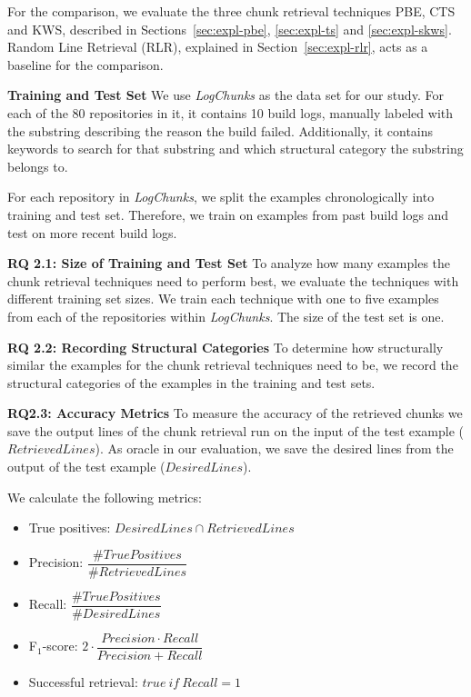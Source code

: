 For the comparison, we evaluate the three chunk retrieval techniques PBE, CTS and KWS, described in Sections~\ref{sec:expl-pbe}, \ref{sec:expl-ts} and \ref{sec:expl-skws}.
Random Line Retrieval (RLR), explained in Section~\ref{sec:expl-rlr}, acts as a baseline for the comparison.

\noindent
\textbf{Training and Test Set}
We use \emph{LogChunks} as the data set for our study.
For each of the 80 repositories in it, it contains 10 build logs, manually labeled with the substring describing the reason the build failed.
Additionally, it contains keywords to search for that substring and which structural category the substring belongs to.

For each repository in \emph{LogChunks}, we split the examples chronologically into training and test set.
Therefore, we train on examples from past build logs and test on more recent build logs.

\noindent
\textbf{RQ 2.1: Size of Training and Test Set}
To analyze how many examples the chunk retrieval techniques need to perform best, we evaluate the techniques with different training set sizes.
We train each technique with one to five examples from each of the repositories within \emph{LogChunks}.
The size of the test set is one.

\noindent
\textbf{RQ 2.2: Recording Structural Categories}
To determine how structurally similar the examples for the chunk retrieval techniques need to be, we record the structural categories of the examples in the training and test sets.

\noindent
\textbf{RQ2.3: Accuracy Metrics}
To measure the accuracy of the retrieved chunks we save the output lines of the chunk retrieval run on the input of the test example ($\mathit{RetrievedLines}$).
As oracle in our evaluation, we save the desired lines from the output of the test example ($\mathit{DesiredLines}$).

We calculate the following metrics:
\begin{itemize}
	 \itemsep0.75em
	\item True positives: $\mathit{DesiredLines} \cap \mathit{RetrievedLines}$
	\item Precision: $\dfrac{\# \mathit{TruePositives}}{\# \mathit{RetrievedLines}}$
	\item Recall: $\dfrac{\# \mathit{TruePositives}}{\# \mathit{DesiredLines}}$
	\item F$_{1}$-score: $2 \cdot \dfrac{\mathit{Precision} \cdot \mathit{Recall}}{\mathit{Precision} + \mathit{Recall}}$
	\item Successful retrieval: $\mathit{true}\ \mathit{if}\ \mathit{Recall} = 1$
\end{itemize}

